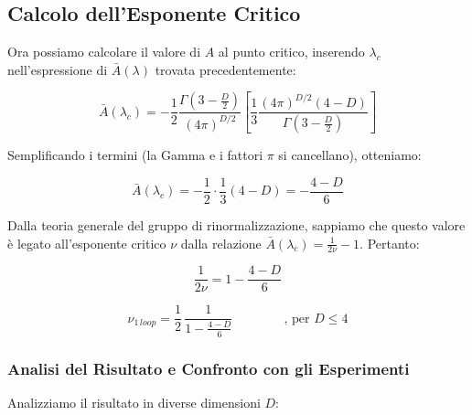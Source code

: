 \subsection{Calcolo dell'Esponente Critico}

Ora possiamo calcolare il valore di $A$ al punto critico, inserendo $\lambda_c$ nell'espressione di $\bar{A}(\lambda)$ trovata precedentemente:

\begin{equation}
\bar{A}(\lambda_c) = -\frac{1}{2} \frac{\Gamma(3 - \frac{D}{2})}{(4\pi)^{D/2}} \left[ \frac{1}{3} \frac{(4\pi)^{D/2} (4-D)}{\Gamma(3 - \frac{D}{2})} \right]
\end{equation}

\noindent Semplificando i termini (la Gamma e i fattori $\pi$ si cancellano), otteniamo:

\begin{equation}
\bar{A}(\lambda_c) = -\frac{1}{2} \cdot \frac{1}{3} (4-D) = - \frac{4-D}{6}
\end{equation}

\noindent Dalla teoria generale del gruppo di rinormalizzazione, sappiamo che questo valore è legato all'esponente critico $\nu$ dalla relazione $\bar{A}(\lambda_c) = \frac{1}{2\nu} - 1$. Pertanto:

\begin{equation}
\frac{1}{2\nu} = 1 - \frac{4-D}{6} 
\end{equation}

\begin{tcolorbox}[colback=yellow!25, colframe=yellow!75!orange, coltitle=black, title=\textbf{Esponente Critico}]
\begin{equation}
    \nu_{1 \, loop} = \frac{1}{2} \, \frac{1}{1 -  \frac{4-D}{6}} \quad \quad \quad \quad \text{, per 
 } D\leq 4
\end{equation}
\end{tcolorbox}

\subsubsection{Analisi del Risultato e Confronto con gli Esperimenti}

Analizziamo il risultato in diverse dimensioni $D$:

